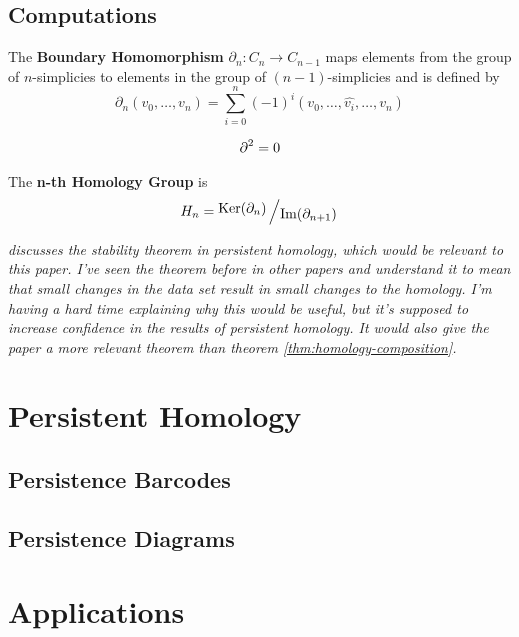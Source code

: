 \subsection{Computations}

\begin{definition}
    The \textbf{Boundary Homomorphism} \(\partial_n : C_n \to C_{n-1}\) maps elements from the group of \(n\)-simplicies to elements in the group of \((n-1)\)-simplicies and is defined by
    \[
        \partial_n (v_0,\dots , v_{n}) = \sum_{i=0}^n (-1)^{i}
        (v_0,\dots, \widehat{v_i}, \dots, v_n)
    \]
    \cite{hatcher}
\end{definition}

\begin{theorem}\label{thm:homology-composition}
	\begin{align*}
		\operatorname{\partial} ^2 = 0
	\end{align*}
\end{theorem}

\begin{definition}
    The \textbf{n-th Homology Group} is \[H_n = \bigslant{\Ker(\partial_n)}{\Ima(\partial_{n+1})}\]
    \cite{fraleigha}
\end{definition}

\textit{\cite{cohen-steiner} discusses the stability theorem in persistent homology, which would be relevant to this paper. I've seen the theorem before in other papers and understand it to mean that small changes in the data set result in small changes to the homology. I'm having a hard time explaining why this would be useful, but it's supposed to increase confidence in the results of persistent homology. It would also give the paper a more relevant theorem than theorem \ref{thm:homology-composition}.}

\section{Persistent Homology}\label{sec:persistent-homology}

\subsection{Persistence Barcodes}

\subsection{Persistence Diagrams}

\section{Applications}\label{sec:applications}

\newpage





